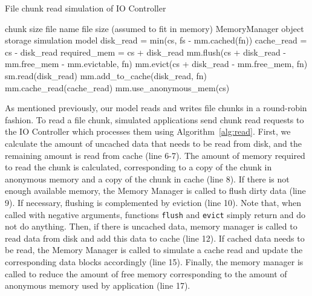 \documentclass[conference]{IEEEtran}
\newcommand{\Desc}[2]{\State \makebox[2em][l]{#1}#2}
\begin{document}
    \begin{algorithm}\caption{File chunk read simulation of IO Controller}
    \label{alg:read}
        \small
        \begin{algorithmic}[1]
            \Input
                \Desc{cs}{chunk size}
                \Desc{fn}{file name}
                \Desc{fs}{file size (assumed to fit in memory)}
                \Desc{mm}{MemoryManager object}
                \Desc{sm}{storage simulation model}
               \EndInput
               \State disk\_read = min(cs, fs - mm.cached(fn)) 
               \State cache\_read = cs - disk\_read 
               \State required\_mem = cs + disk\_read
               \State mm.flush(cs + disk\_read - mm.free\_mem - mm.evictable, fn) 
               \State mm.evict(cs + disk\_read - mm.free\_mem, fn) 
                     
               \State sm.read(disk\_read)  
               \State mm.add\_to\_cache(disk\_read, fn)     
               \EndIf
                
               \State mm.cache\_read(cache\_read)  
            \EndIf
            \State mm.use\_anonymous\_mem(cs)
        \end{algorithmic}
    \end{algorithm}
    As mentioned previously, our model reads and writes file chunks in a
    round-robin fashion. To read a file chunk, simulated applications send
    chunk read requests to the IO Controller which processes them using
    Algorithm~\ref{alg:read}. First, we calculate the amount of uncached
    data that needs to be read from disk, and the remaining amount is read
    from cache (line 6-7). The amount of memory required to read the chunk
    is calculated, corresponding to a copy of the chunk in anonymous memory
    and a copy of the chunk in cache (line 8). 
    If there is not enough available memory, the Memory Manager is called
    to flush dirty data (line 9). If necessary, flushing is complemented by
    eviction (line 10). Note that, when called with negative arguments, functions
    \texttt{flush} and \texttt{evict} simply return and do not do anything. Then, if there is
    uncached data, memory manager is called to read data from disk and add this 
    data to cache (line 12).
    If cached data needs to be read, the Memory Manager is called to simulate 
    a cache read  and update the corresponding data blocks accordingly (line 15).
    Finally, the memory manager is called to reduce the amount of free memory 
    corresponding to the amount of anonymous memory used by application (line 17).
\end{document}
